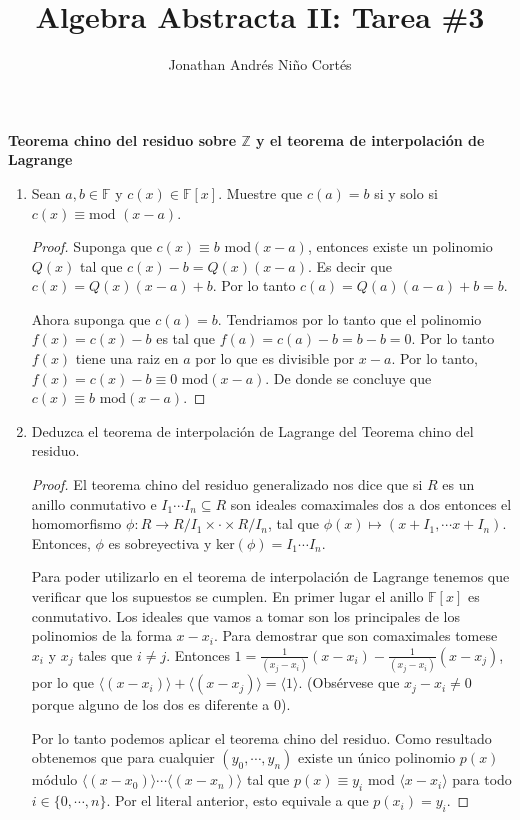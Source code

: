\documentclass[letter,twoside,12pt]{article}
\title{Algebra Abstracta II: Tarea \#3}
\author{Jonathan Andr\'es Ni\~no Cort\'es}
\begin{document}
\maketitle
\textbf{Teorema chino del residuo sobre $\mathbb{Z}$ y el teorema de interpolaci\'on de Lagrange}
\begin{enumerate}[label=\textbf{(\alph*)}]
\item Sean $a,b \in \mathbb{F}$ y $ c(x) \in \mathbb{F}[x]$. Muestre que $ c(a)=b $ si y solo si $ c(x) \equiv \text{mod } (x-a) $.

\begin{proof}
Suponga que $c(x) \equiv b \text{ mod} (x-a)$, entonces existe un polinomio $ Q(x) $ tal que $c(x)-b=Q(x)(x-a)$. Es decir que $c(x)=Q(x)(x-a)+b$. Por lo tanto $c(a)=Q(a)(a-a)+b=b$.

Ahora suponga que $c(a)=b$. Tendriamos por lo tanto que el polinomio $f(x)=c(x)-b$ es tal que $ f(a)=c(a)-b=b-b = 0$. Por lo tanto $f(x)$ tiene una raiz en $a$ por lo que es divisible por $ x-a $. Por lo tanto, $f(x)=c(x)-b \equiv 0 \text{ mod} (x-a)$. De donde se concluye que $c(x) \equiv b \text{ mod} (x-a)$.
\end{proof}

\item Deduzca el teorema de interpolaci\'on de Lagrange del Teorema chino del residuo.
\begin{proof}
El teorema chino del residuo generalizado nos dice que si $R$ es un anillo conmutativo e $I_1 \cdots I_n \subseteq R$ son ideales comaximales dos a dos entonces el homomorfismo $\phi:R \to R/I_1 \times \cdot \times R/I_n$, tal que $\phi(x) \mapsto (x+I_1, \cdots x+I_n)$. Entonces, $\phi$ es sobreyectiva y ker$ (\phi)=I_1\cdots I_n$. 

Para poder utilizarlo en el teorema de interpolaci\'on de Lagrange tenemos que verificar que los supuestos se cumplen. En primer lugar el anillo $\mathbb{F}[x]$ es conmutativo. Los ideales que vamos a tomar son los principales de los polinomios de la forma $ x-x_i $. Para demostrar que son comaximales tomese $x_i$ y $x_j$ tales que $i \not = j$. Entonces $ 1= \frac{1}{(x_j-x_i)}(x-x_i)-\frac{1}{(x_j-x_i)}(x-x_j) $, por lo que $\langle(x-x_i) \rangle + \langle(x-x_j) \rangle = \langle 1 \rangle$. (Obs\'ervese que $x_j-x_i \not = 0$ porque alguno de los dos es diferente a $0$).

Por lo tanto podemos aplicar el teorema chino del residuo. Como resultado obtenemos que para cualquier $(y_0, \cdots, y_n)$ existe un \'unico polinomio $p(x)$ m\'odulo $ \langle(x-x_0) \rangle\cdots \langle(x-x_n) \rangle $ tal que $p(x) \equiv y_i$ mod $ \langle x-x_i \rangle$ para todo $i \in \{0,\cdots, n\}$. Por el literal anterior, esto equivale a que $p(x_i)=y_i$.


\end{proof}
\end{enumerate}
\end{document}
